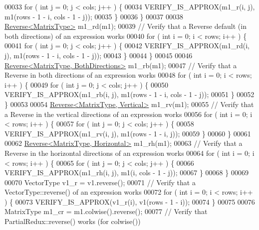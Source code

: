 \begin{DoxyCode}
00033     \textcolor{keywordflow}{for} ( \textcolor{keywordtype}{int} j = 0; j < cols; j++ ) \{
00034       VERIFY\_IS\_APPROX(m1\_r(i, j), m1(rows - 1 - i, cols - 1 - j));
00035     \}
00036   \}
00037 
00038   \hyperlink{group___core___module_class_eigen_1_1_reverse}{Reverse<MatrixType>} m1\_rd(m1);
00039   \textcolor{comment}{// Verify that a Reverse default (in both directions) of an expression works}
00040   \textcolor{keywordflow}{for} ( \textcolor{keywordtype}{int} i = 0; i < rows; i++ ) \{
00041     \textcolor{keywordflow}{for} ( \textcolor{keywordtype}{int} j = 0; j < cols; j++ ) \{
00042       VERIFY\_IS\_APPROX(m1\_rd(i, j), m1(rows - 1 - i, cols - 1 - j));
00043     \}
00044   \}
00045 
00046   \hyperlink{group___core___module_class_eigen_1_1_reverse}{Reverse<MatrixType, BothDirections>} m1\_rb(m1);
00047   \textcolor{comment}{// Verify that a Reverse in both directions of an expression works}
00048   \textcolor{keywordflow}{for} ( \textcolor{keywordtype}{int} i = 0; i < rows; i++ ) \{
00049     \textcolor{keywordflow}{for} ( \textcolor{keywordtype}{int} j = 0; j < cols; j++ ) \{
00050       VERIFY\_IS\_APPROX(m1\_rb(i, j), m1(rows - 1 - i, cols - 1 - j));
00051     \}
00052   \}
00053 
00054   \hyperlink{group___core___module_class_eigen_1_1_reverse}{Reverse<MatrixType, Vertical>} m1\_rv(m1);
00055   \textcolor{comment}{// Verify that a Reverse in the vertical directions of an expression works}
00056   \textcolor{keywordflow}{for} ( \textcolor{keywordtype}{int} i = 0; i < rows; i++ ) \{
00057     \textcolor{keywordflow}{for} ( \textcolor{keywordtype}{int} j = 0; j < cols; j++ ) \{
00058       VERIFY\_IS\_APPROX(m1\_rv(i, j), m1(rows - 1 - i, j));
00059     \}
00060   \}
00061 
00062   \hyperlink{group___core___module_class_eigen_1_1_reverse}{Reverse<MatrixType, Horizontal>} m1\_rh(m1);
00063   \textcolor{comment}{// Verify that a Reverse in the horizontal directions of an expression works}
00064   \textcolor{keywordflow}{for} ( \textcolor{keywordtype}{int} i = 0; i < rows; i++ ) \{
00065     \textcolor{keywordflow}{for} ( \textcolor{keywordtype}{int} j = 0; j < cols; j++ ) \{
00066       VERIFY\_IS\_APPROX(m1\_rh(i, j), m1(i, cols - 1 - j));
00067     \}
00068   \}
00069 
00070   VectorType v1\_r = v1.reverse();
00071   \textcolor{comment}{// Verify that a VectorType::reverse() of an expression works}
00072   \textcolor{keywordflow}{for} ( \textcolor{keywordtype}{int} i = 0; i < rows; i++ ) \{
00073     VERIFY\_IS\_APPROX(v1\_r(i), v1(rows - 1 - i));
00074   \}
00075 
00076   MatrixType m1\_cr = m1.colwise().reverse();
00077   \textcolor{comment}{// Verify that PartialRedux::reverse() works (for colwise())}

\end{DoxyCode}
